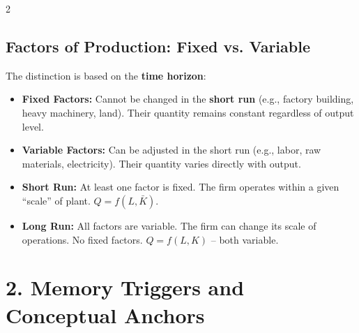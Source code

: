 \documentclass[10pt,a4paper]{article}
\begin{document}
\begin{multicols}{2}
\subsection*{Factors of Production: Fixed vs. Variable}
The distinction is based on the \textbf{time horizon}:
\begin{itemize}[leftmargin=*,nosep]
    \item \textbf{Fixed Factors:} Cannot be changed in the \textbf{short run} (e.g., factory building, heavy machinery, land). Their quantity remains constant regardless of output level.
    \item \textbf{Variable Factors:} Can be adjusted in the short run (e.g., labor, raw materials, electricity). Their quantity varies directly with output.
    \item \textbf{Short Run:} At least one factor is fixed. The firm operates within a given ``scale'' of plant. $Q = f(L, \bar{K})$.
    \item \textbf{Long Run:} All factors are variable. The firm can change its scale of operations. No fixed factors. $Q = f(L, K)$ -- both variable.
\end{itemize}

\section*{2. Memory Triggers and Conceptual Anchors}


\end{multicols}
\end{document}
